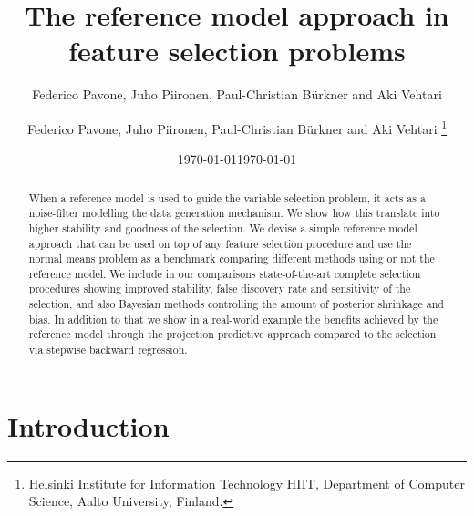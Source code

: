 \documentclass[american,]{article}
\title{The reference model approach in feature selection problems 
	\vspace{.1in}}
\author{Federico Pavone, Juho Piironen, Paul-Christian B\"{u}rkner and Aki Vehtari}
\author{
    Federico Pavone, 
  Juho Piironen,
  Paul-Christian B\"{u}rkner
  and Aki Vehtari \footnote{Helsinki Institute for Information Technology HIIT,
  Department of Computer Science, Aalto University, Finland.}
  }
\date{\today}
\date{\today}
\theoremstyle{definition}
\begin{document}
\maketitle
\begin{abstract}
When a reference model is used to guide the variable selection problem, it acts as a noise-filter modelling the data generation mechanism. We show how this translate into higher stability and goodness of the selection. We devise a simple reference model approach that can be used on top of any feature selection procedure and use the normal means problem as a benchmark comparing different methods using or not the reference model. We include in our comparisons state-of-the-art complete selection procedures showing improved stability, false discovery rate and sensitivity of the selection, and also Bayesian methods controlling the amount of posterior shrinkage and bias. In addition to that we show in a real-world example the benefits achieved by the reference model through the projection predictive approach compared to the selection via stepwise backward regression.
\end{abstract}

\hypertarget{introduction}{%
\section{Introduction}\label{introduction}}

\end{document}
